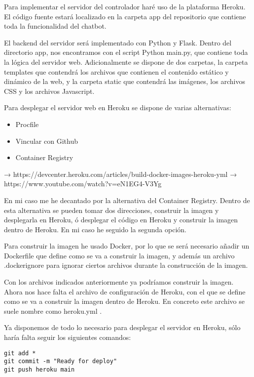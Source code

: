 
Para implementar el servidor del controlador haré uso de la plataforma Heroku. El código fuente estará localizado en la carpeta app del repositorio que contiene toda la funcionalidad del chatbot.

El backend del servidor será implementado con Python y Flask. Dentro del directorio app, nos encontramos con el script Python main.py, que contiene toda la lógica del servidor web. Adicionalmente se dispone de dos carpetas, la carpeta templates que contendrá los archivos que contienen el contenido estático y dinámico de la web, y la carpeta static que contendrá las imágenes, los archivos CSS y los archivos Javascript.

Para desplegar el servidor web en Heroku se dispone de varias alternativas:

\begin{itemize}
    \item Procfile
    \item Vincular con Github
    \item Container Registry
\end{itemize}

→ https://devcenter.heroku.com/articles/build-docker-images-heroku-yml
→ https://www.youtube.com/watch?v=eN1EG4-V3Yg

En mi caso me he decantado por la alternativa del Container Registry. Dentro de esta alternativa se pueden tomar dos direcciones, construir la imagen y desplegarla en Heroku, ó desplegar el código en Heroku y construir la imagen dentro de Heroku. En mi caso he seguido la segunda opción.

Para construir la imagen he usado Docker, por lo que se será necesario añadir un Dockerfile que define como se va a construir la imagen, y además un archivo .dockerignore para ignorar ciertos archivos durante la construcción de la imagen.

Con los archivos indicados anteriormente ya podríamos construir la imagen. Ahora nos hace falta el archivo de configuración de Heroku, con el que se define como se va a construir la imagen dentro de Heroku. En concreto este archivo se suele nombre como heroku.yml .

Ya disponemos de todo lo necesario para desplegar el servidor en Heroku, sólo haría falta seguir los siguientes comandos:


\begin{lstlisting}
git add *
git commit -m "Ready for deploy"
git push heroku main
\end{lstlisting}


